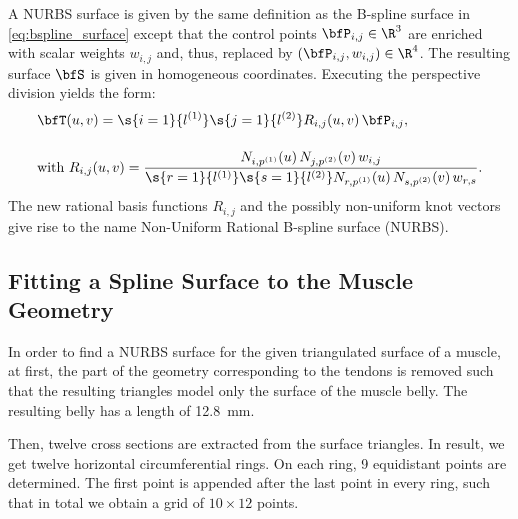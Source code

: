 A NURBS surface is given by the same definition as the B-spline surface in \cref{eq:bspline_surface} except that the control points $\bfP_{i,j} \in \R^3$ are enriched with scalar weights $w_{i,j}$ and, thus, replaced by $(\bfP_{i,j}, w_{i,j}) \in \R^4$. The resulting surface $\bfS$ is given in homogeneous coordinates. Executing the perspective division yields the form:
%
\begin{align*}
  &\bfT(u,v) = \s{i=1}{l^{(1)}}\s{j=1}{l^{(2)}} R_{i,j}(u,v) \,\bfP_{i,j},\\[4mm]
  &\text{with } R_{i,j}(u,v) = \dfrac{N_{i,p^{(1)}}(u)\,N_{j,p^{(2)}}(v)\,w_{i,j}}{\s{r=1}{l^{(1)}}\s{s=1}{l^{(2)}} N_{r,p^{(1)}}(u)\,N_{s,p^{(2)}}(v)\,w_{r,s}}.
\end{align*}
The new rational basis functions $R_{i,j}$ and the possibly non-uniform knot vectors give rise to the name Non-Uniform Rational B-spline surface (NURBS).

\subsection{Fitting a Spline Surface to the Muscle Geometry}
In order to find a NURBS surface for the given triangulated surface of a muscle, at first, the part of the geometry corresponding to the tendons is removed such that the resulting triangles model only the surface of the muscle belly. The resulting belly has a length of \SI{12.8}{\mm}.

Then, twelve cross sections are extracted from the surface triangles. In result, we get twelve horizontal circumferential rings. On each ring, 9 equidistant points are determined. The first point is appended after the last point in every ring, such that in total we obtain a grid of $10 \times 12$ points. 

